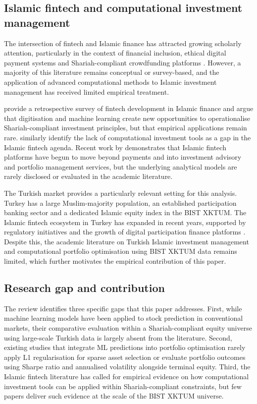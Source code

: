 \subsection{Islamic fintech and computational investment management}

The intersection of fintech and Islamic finance has attracted growing scholarly
attention, particularly in the context of financial inclusion, ethical digital
payment systems and Shariah-compliant crowdfunding platforms
\citep{rabbani2021islamic, hasan2020fintech, unal2022fintech}. However,
a majority of this literature remains conceptual or survey-based, and the
application of advanced computational methods to Islamic investment
management has received limited empirical treatment.

\citet{unal2022fintech} provide a retrospective survey of fintech development
in Islamic finance and argue that digitisation and machine learning create new
opportunities to operationalise Shariah-compliant investment principles, but
that empirical applications remain rare. \citet{hasan2020fintech} similarly
identify the lack of computational investment tools as a gap in the Islamic
fintech agenda. Recent work by \citet{rabbani2021islamic} demonstrates that
Islamic fintech platforms have begun to move beyond payments and into
investment advisory and portfolio management services, but the underlying
analytical models are rarely disclosed or evaluated in the academic literature.

The Turkish market provides a particularly relevant setting for this analysis.
Turkey has a large Muslim-majority population, an established participation
banking sector and a dedicated Islamic equity index in the BIST XKTUM.
The Islamic fintech ecosystem in Turkey has expanded in recent years, supported
by regulatory initiatives and the growth of digital participation finance platforms
\citep{sakarya2021fintech}. Despite this, the academic literature on Turkish
Islamic investment management and computational portfolio optimisation using
BIST XKTUM data remains limited, which further motivates the empirical
contribution of this paper.

\subsection{Research gap and contribution}

The review identifies three specific gaps that this paper addresses. First, while
machine learning models have been applied to stock prediction in conventional
markets, their comparative evaluation within a Shariah-compliant equity universe
using large-scale Turkish data is largely absent from the literature. Second,
existing studies that integrate ML predictions into portfolio optimisation rarely
apply L1 regularisation for sparse asset selection or evaluate portfolio outcomes
using Sharpe ratio and annualised volatility alongside terminal equity. Third,
the Islamic fintech literature has called for empirical evidence on how computational
investment tools can be applied within Shariah-compliant constraints, but few
papers deliver such evidence at the scale of the BIST XKTUM universe.

